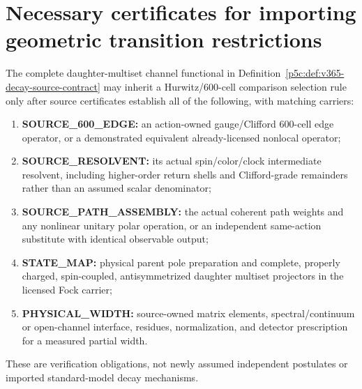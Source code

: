 \documentclass[12pt,a4paper]{article}
\begin{document}
\section{Necessary certificates for importing geometric transition restrictions}
\label{p5c:sec:v3027-geometric-decay-certificate}
\begin{definition}
\label{p5c:def:v3027-geometric-decay-certificate}
The complete daughter-multiset channel functional in
Definition~\ref{p5c:def:v365-decay-source-contract} may inherit a
Hurwitz/$600$-cell comparison selection rule only after source
certificates establish all of the following, with matching carriers:
\begin{enumerate}
\item \textbf{SOURCE\_600\_EDGE:} an action-owned gauge/Clifford
$600$-cell edge operator, or a demonstrated equivalent already-licensed
nonlocal operator;
\item \textbf{SOURCE\_RESOLVENT:} its actual spin/color/clock
intermediate resolvent, including higher-order return shells and
Clifford-grade remainders rather than an assumed scalar denominator;
\item \textbf{SOURCE\_PATH\_ASSEMBLY:} the actual coherent
path weights and any nonlinear unitary polar operation, or an
independent same-action substitute with identical observable output;
\item \textbf{STATE\_MAP:} physical parent pole preparation and
complete, properly charged, spin-coupled, antisymmetrized daughter
multiset projectors in the licensed Fock carrier;
\item \textbf{PHYSICAL\_WIDTH:} source-owned matrix elements,
spectral/continuum or open-channel interface, residues, normalization,
and detector prescription for a measured partial width.
\end{enumerate}
These are verification obligations, not newly assumed independent
postulates or imported standard-model decay mechanisms.
\end{definition}
\end{document}
